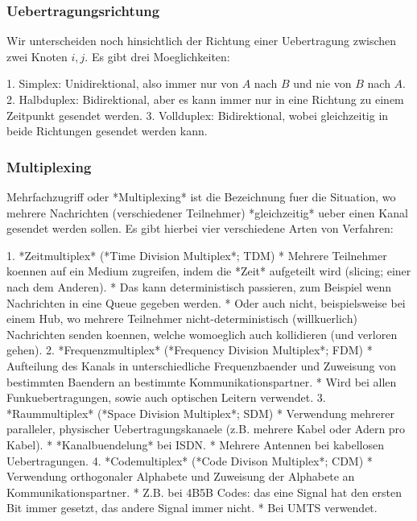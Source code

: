 \subsubsection{Uebertragungsrichtung} 

Wir unterscheiden noch hinsichtlich der Richtung einer Uebertragung zwischen
zwei Knoten $i, j$. Es gibt drei Moeglichkeiten:

1. Simplex: Unidirektional, also immer nur von $A$ nach $B$ und nie von $B$ nach
   $A$.
2. Halbduplex: Bidirektional, aber es kann immer nur in eine Richtung zu einem
   Zeitpunkt gesendet werden.
3. Vollduplex: Bidirektional, wobei gleichzeitig in beide Richtungen gesendet
   werden kann.

\subsubsection{Multiplexing} 

Mehrfachzugriff oder *Multiplexing* ist die Bezeichnung fuer die Situation, wo
mehrere Nachrichten (verschiedener Teilnehmer) *gleichzeitig* ueber einen Kanal
gesendet werden sollen. Es gibt hierbei vier verschiedene Arten von Verfahren:

1. *Zeitmultiplex* (*Time Division Multiplex*; TDM)
   * Mehrere Teilnehmer koennen auf ein Medium zugreifen, indem die *Zeit*
     aufgeteilt wird (slicing; einer nach dem Anderen).
   * Das kann deterministisch passieren, zum Beispiel wenn Nachrichten in eine
     Queue gegeben werden.
   * Oder auch nicht, beispielsweise bei einem Hub, wo mehrere Teilnehmer
     nicht-deterministisch (willkuerlich) Nachrichten senden koennen, welche
     womoeglich auch kollidieren (und verloren gehen).
2. *Frequenzmultiplex* (*Frequency Division Multiplex*; FDM)
   * Aufteilung des Kanals in unterschiedliche Frequenzbaender und Zuweisung von
     bestimmten Baendern an bestimmte Kommunikationspartner.
   * Wird bei allen Funkuebertragungen, sowie auch optischen Leitern verwendet.
3. *Raummultiplex* (*Space Division Multiplex*; SDM)
   * Verwendung mehrerer paralleler, physischer Uebertragungskanaele
     (z.B. mehrere Kabel oder Adern pro Kabel).
   * *Kanalbuendelung* bei ISDN.
   * Mehrere Antennen bei kabellosen Uebertragungen.
4. *Codemultiplex* (*Code Divison Multiplex*; CDM)
   * Verwendung orthogonaler Alphabete und Zuweisung der Alphabete an
     Kommunikationspartner.
   * Z.B. bei 4B5B Codes: das eine Signal hat den ersten Bit immer gesetzt, das
     andere Signal immer nicht.
   * Bei UMTS verwendet.

